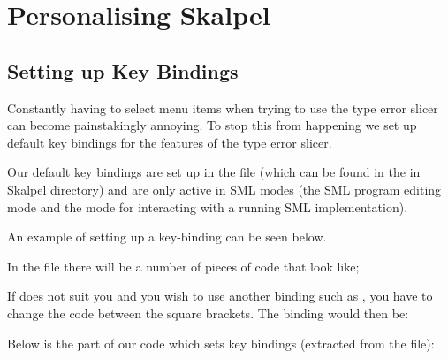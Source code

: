 \documentclass{report}
\begin{document}
\section{Personalising Skalpel}


\subsection{Setting up Key Bindings}
\label{sec:setting-key-bindings}

Constantly having to select menu items when trying to use the type
error slicer can become painstakingly annoying.  To stop this from
happening we set up default key bindings for the features of the type
error slicer.


Our default key bindings are set up in the file
 (which can be found in the
 in Skalpel directory) and are only
active in SML modes (the SML program editing mode and the mode for
interacting with a running SML implementation).


\medskip
An example of setting up a key-binding can be seen below.

In the file  there will be a number of
pieces of code that look like;

If  does not suit you and you wish to use another
binding such as , you have to change the
code between the square brackets.  The binding would then be:


\medskip
Below is the part of our code which sets key bindings (extracted from
the  file):
\end{document}
